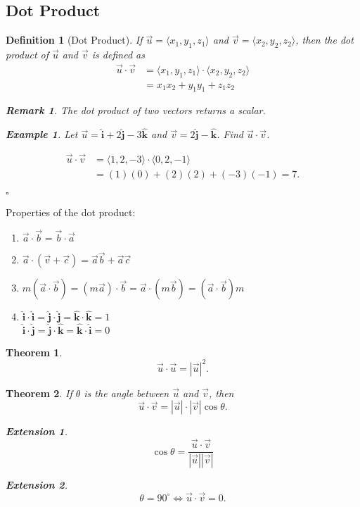 \documentclass[12pt,a4paper]{article}
\newtheorem{thm}{Theorem}[subsection]
\newtheorem{df}{Definition}[subsection]
\newtheorem{eg}{Example}[subsection]
\newenvironment*{ans}{\par\indent{\textit{Answer. }}\par}{\par\hfill{$\square$}\par}
\newtheorem*{rmk}{\indent Remark}
\newtheorem*{ext}{\indent Extension}
\def\vecv{\vec{v}}
\def\vecu{\vec{u}}
\def\veca{\vec{a}}
\def\vecb{\vec{b}}
\def\vecc{\vec{c}}
\def\veci{\hat{\boldsymbol{\textbf{i}}}}
\def\vecj{\hat{\boldsymbol{\textbf{j}}}}
\def\veck{\hat{\boldsymbol{\textbf{k}}}}
\begin{document}
\subsection{Dot Product}
\begin{df}[Dot Product]
	If $\vecu=\langle x_1,y_1,z_1\rangle$ and $\vecv=\langle x_2,y_2,z_2\rangle$, then the dot product of $\vecu$ and $\vecv$ is defined as \[\begin{aligned}
		\vecu\cdot\vecv&=\langle x_1,y_1,z_1\rangle\cdot\langle x_2,y_2,z_2\rangle\\
		&=x_1x_2+y_1y_1+z_1z_2 
	\end{aligned}\]	
	\begin{rmk} The dot product of two vectors returns a scalar. \end{rmk}
	\begin{eg}
		Let $\vecu=\veci+2\vecj-3\veck$ and $\vecv=2\vecj-\veck$. Find $\vecu\cdot\vecv$.
		\begin{ans}
			\[\begin{aligned}
			\vecu\cdot\vecv&=\langle1,2,-3\rangle\cdot\langle0,2,-1\rangle\\
				&=(1)(0)+(2)(2)+(-3)(-1)=7.
			\end{aligned}\]	
		\end{ans}
	\end{eg}
\end{df}
Properties of the dot product: 
\begin{enumerate}
	\item $\veca\cdot\vecb=\vecb\cdot\veca$
	\item $\veca\cdot(\vecv+\vecc)=\veca\vecb+\veca\vecc$
	\item $m(\veca\cdot\vecb)=(m\veca)\cdot\vecb=\veca\cdot(m\vecb)=(\veca\cdot\vecb)m$
	\item $\veci\cdot\veci=\vecj\cdot\vecj=\veck\cdot\veck=1$\\$\veci\cdot\vecj=\vecj\cdot\veck=\veck\cdot\veci=0$
\end{enumerate}
\begin{thm}
	\[\vecu\cdot\vecu=|\vecu|^2.\]	
\end{thm}
\begin{thm}
	If $\theta$ is the angle between $\vecu$ and $\vecv$, then \[\boxed{\vecu\cdot\vecv=|\vecu|\cdot|\vecv|\cos\theta}.\]
	\begin{ext} \[\cos\theta=\frac{\vecu\cdot\vecv}{|\vecu||\vecv|}\]\end{ext}
	\begin{ext} \[\theta=90^\circ\Longleftrightarrow\vecu\cdot\vecv=0.\]	\end{ext}
\end{thm}
\end{document}
